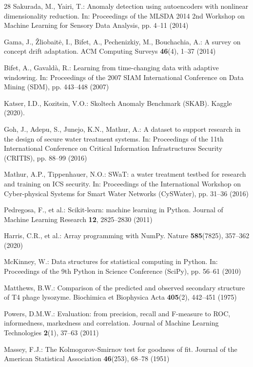 \documentclass[runningheads]{llncs}
\begin{document}
\begin{thebibliography}{28}
Sakurada, M., Yairi, T.: Anomaly detection using autoencoders with nonlinear
dimensionality reduction. In: Proceedings of the MLSDA 2014 2nd Workshop on
Machine Learning for Sensory Data Analysis, pp. 4--11 (2014)

Gama, J., \v{Z}liobait\.{e}, I., Bifet, A., Pechenizkiy, M., Bouchachia, A.: A
survey on concept drift adaptation. ACM Computing Surveys \textbf{46}(4), 1--37
(2014)

Bifet, A., Gavald\`a, R.: Learning from time-changing data with adaptive
windowing. In: Proceedings of the 2007 SIAM International Conference on Data
Mining (SDM), pp. 443--448 (2007)

Katser, I.D., Kozitsin, V.O.: Skoltech Anomaly Benchmark (SKAB). Kaggle (2020).

Goh, J., Adepu, S., Junejo, K.N., Mathur, A.: A dataset to support research in
the design of secure water treatment systems. In: Proceedings of the 11th
International Conference on Critical Information Infrastructures Security
(CRITIS), pp. 88--99 (2016)

Mathur, A.P., Tippenhauer, N.O.: SWaT: a water treatment testbed for research
and training on ICS security. In: Proceedings of the International Workshop on
Cyber-physical Systems for Smart Water Networks (CySWater), pp. 31--36 (2016)

Pedregosa, F., et al.: Scikit-learn: machine learning in Python. Journal of
Machine Learning Research \textbf{12}, 2825--2830 (2011)

Harris, C.R., et al.: Array programming with NumPy. Nature \textbf{585}(7825),
357--362 (2020)

McKinney, W.: Data structures for statistical computing in Python. In:
Proceedings of the 9th Python in Science Conference (SciPy), pp. 56--61 (2010)

Matthews, B.W.: Comparison of the predicted and observed secondary structure of
T4 phage lysozyme. Biochimica et Biophysica Acta \textbf{405}(2), 442--451
(1975)

Powers, D.M.W.: Evaluation: from precision, recall and F-measure to ROC,
informedness, markedness and correlation. Journal of Machine Learning
Technologies \textbf{2}(1), 37--63 (2011)

Massey, F.J.: The Kolmogorov-Smirnov test for goodness of fit. Journal of the
American Statistical Association \textbf{46}(253), 68--78 (1951)


\end{thebibliography}
\end{document}
